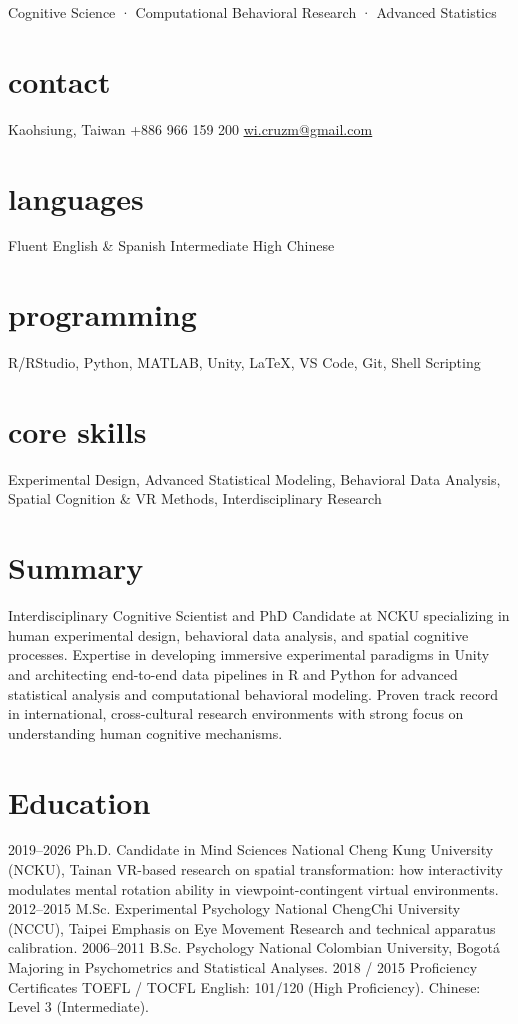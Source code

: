 \documentclass[]{friggeri-cv}
\let\OrigHref\href
\renewcommand{\href}[2]{\OrigHref{#1}{\bodyfont\color{blue}\uline{#2}}}
\begin{document}
       {Cognitive Science · Computational Behavioral Research · Advanced Statistics}

\begin{aside}
  \section{contact}
    Kaohsiung, Taiwan
    +886 966 159 200
    \href{mailto:wi.cruzm@gmail.com}{wi.cruzm@gmail.com}
  \section{languages}
    Fluent English \& Spanish
    Intermediate High Chinese
  \section{programming}
    R/RStudio, Python, MATLAB,
    Unity, \LaTeX, VS Code,
    Git, Shell Scripting
  \section{core skills}
    Experimental Design,
    Advanced Statistical Modeling,
    Behavioral Data Analysis,
    Spatial Cognition \& VR Methods,
    Interdisciplinary Research
\end{aside}

\section{Summary}
Interdisciplinary Cognitive Scientist and PhD Candidate at NCKU specializing in human experimental design, behavioral data analysis, and spatial cognitive processes. Expertise in developing immersive experimental paradigms in Unity and architecting end-to-end data pipelines in R and Python for advanced statistical analysis and computational behavioral modeling. Proven track record in international, cross-cultural research environments with strong focus on understanding human cognitive mechanisms.

\section{Education}
\begin{entrylist}
  \entry
    {2019–2026}
    {Ph.D. Candidate in Mind Sciences}
    {National Cheng Kung University (NCKU), Tainan}
    {VR-based research on spatial transformation: how interactivity modulates mental rotation ability in viewpoint-contingent virtual environments.}
  \entry
    {2012–2015}
    {M.Sc. Experimental Psychology}
    {National ChengChi University (NCCU), Taipei}
    {Emphasis on Eye Movement Research and technical apparatus calibration.}
  \entry
    {2006–2011}
    {B.Sc. Psychology}
    {National Colombian University, Bogotá}
    {Majoring in Psychometrics and Statistical Analyses.}
  \entry
    {2018 / 2015}
    {Proficiency Certificates}
    {TOEFL / TOCFL}
    {English: 101/120 (High Proficiency). Chinese: Level 3 (Intermediate).}
\end{entrylist}
\end{document}
